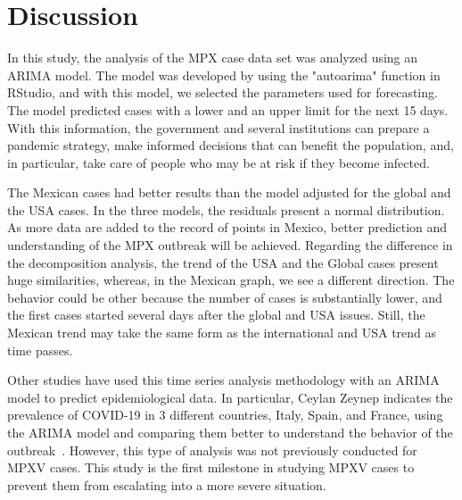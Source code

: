 \documentclass[conference]{IEEEtran}
\begin{document}
\section{Discussion}

In this study, the analysis of the MPX case data set was analyzed using an ARIMA model. The model was developed by using the "autoarima" function in RStudio, and with this model, we selected the parameters used for forecasting. The model predicted cases with a lower and an upper limit for the next 15 days. With this information, the government and several institutions can prepare a pandemic strategy, make informed decisions that can benefit the population, and, in particular, take care of people who may be at risk if they become infected. 

The Mexican cases had better results than the model adjusted for the global and the USA cases. In the three models, the residuals present a normal distribution. As more data are added to the record of points in Mexico, better prediction and understanding of the MPX outbreak will be achieved. Regarding the difference in the decomposition analysis, the trend of the USA and the Global cases present huge similarities, whereas, in the Mexican graph, we see a different direction. The behavior could be other because the number of cases is substantially lower, and the first cases started several days after the global and USA issues. Still, the Mexican trend may take the same form as the international and USA trend as time passes.

Other studies have used this time series analysis methodology with an ARIMA model to predict epidemiological data. In particular, Ceylan Zeynep indicates the prevalence of COVID-19 in 3 different countries, Italy, Spain, and France, using the ARIMA model and comparing them better to understand the behavior of the outbreak~\cite{Ceylan2020}. However, this type of analysis was not previously conducted for MPXV cases. This study is the first milestone in studying MPXV cases to prevent them from escalating into a more severe situation.
\end{document}
